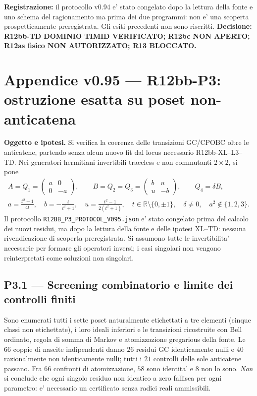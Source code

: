 \documentclass[11pt,a4paper]{article}
\begin{document}
\textbf{Registrazione:} il protocollo v0.94 e' stato congelato dopo la lettura della fonte e uno schema del ragionamento ma prima dei due programmi: non e' una scoperta prospetticamente preregistrata. Gli esiti precedenti non sono riscritti. \textbf{Decisione: R12bb-TD DOMINIO TIMID VERIFICATO; R12bc NON APERTO; R12as fisico NON AUTORIZZATO; R13 BLOCCATO.}
\endgroup

\clearpage
\begingroup
\setlength{\parskip}{0.12em}
\section*{Appendice v0.95 --- R12bb-P3: ostruzione esatta su poset non-anticatena}
\textbf{Oggetto e ipotesi.} Si verifica la coerenza delle transizioni GC/CPOBC oltre le anticatene, partendo senza alcun nuovo fit dal locus necessario R12bb-XL--L3--TD. Nei generatori hermitiani invertibili traceless e non commutanti $2\times2$, si pone
\begin{equation}
\begin{gathered}
 A=Q_1=\begin{pmatrix}a&0\\0&-a\end{pmatrix},\qquad
 B=Q_2=Q_3=\begin{pmatrix}b&u\\u&-b\end{pmatrix},\qquad Q_4=\delta B,\\
 a=\frac{t^2+1}{4t},\quad b=-\frac{t}{t^2+1},\quad u=\frac{t^2-1}{2(t^2+1)},\quad
 t\in\mathbb R\setminus\{0,\pm1\},\quad \delta\ne0,\quad a^2\notin\{1,2,3\}.
\end{gathered}\tag{P3.1}
\end{equation}
Il protocollo \texttt{R12BB\_P3\_PROTOCOL\_V095.json} e' stato congelato prima del calcolo dei nuovi residui, ma dopo la lettura della fonte e delle ipotesi XL--TD: nessuna rivendicazione di scoperta preregistrata. Si assumono tutte le invertibilita' necessarie per formare gli operatori inversi; i casi singolari non vengono reinterpretati come soluzioni non singolari.

\subsection*{P3.1 --- Screening combinatorio e limite dei controlli finiti}
Sono enumerati tutti i sette poset naturalmente etichettati a tre elementi (cinque classi non etichettate), i loro ideali inferiori e le transizioni ricostruite con Bell ordinato, regola di somma di Markov e atomizzazione gregarious della fonte. Le $66$ coppie di nascite indipendenti danno $26$ residui GC identicamente nulli e $40$ razionalmente non identicamente nulli; tutti i $21$ controlli delle sole anticatene passano. Fra $66$ confronti di atomizzazione, $58$ sono identita' e $8$ non lo sono. \emph{Non} si conclude che ogni singolo residuo non identico a zero fallisca per ogni parametro: e' necessario un certificato senza radici reali ammissibili.
\end{document}
